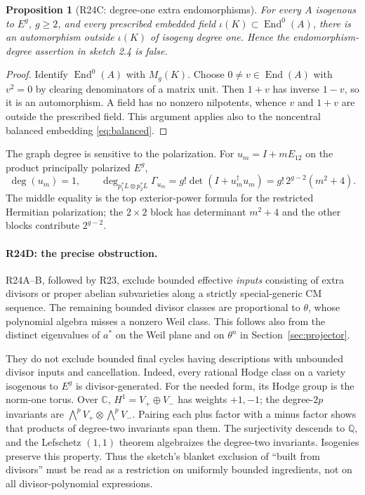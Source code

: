 \documentclass[11pt,a4paper]{article}
\newtheorem{proposition}[theorem]{Proposition}
\theoremstyle{definition}\newtheorem{definition}[theorem]{Definition}
\theoremstyle{remark}\newtheorem{remark}[theorem]{Remark}
\newcommand{\Q}{\mathbb Q}\newcommand{\Z}{\mathbb Z}\newcommand{\C}{\mathbb C}\newcommand{\R}{\mathbb R}
\newcommand{\End}{\operatorname{End}}\newcommand{\NS}{\operatorname{NS}}\newcommand{\Hom}{\operatorname{Hom}}
\begin{document}
\begin{proposition}[R24C: degree-one extra endomorphisms]\label{R24C}
For every $A$ isogenous to $E^g$, $g\ge2$, and every prescribed embedded field $\iota(K)\subset\End^0(A)$, there is an automorphism outside $\iota(K)$ of isogeny degree one. Hence the endomorphism-degree assertion in sketch 2.4 is false.
\end{proposition}
\begin{proof}
Identify $\End^0(A)$ with $M_g(K)$. Choose $0\ne v\in\End(A)$ with $v^2=0$ by clearing denominators of a matrix unit. Then $1+v$ has inverse $1-v$, so it is an automorphism. A field has no nonzero nilpotents, whence $v$ and $1+v$ are outside the prescribed field. This argument applies also to the noncentral balanced embedding \eqref{eq:balanced}.
\end{proof}

The graph degree is sensitive to the polarization. For $u_m=I+mE_{12}$ on the product principally polarized $E^g$,
\begin{equation}\label{eq:unipotentgraph}
 \deg(u_m)=1,\qquad
 \deg_{p_1^*L\otimes p_2^*L}\Gamma_{u_m}
 =g!\det(I+u_m^\dagger u_m)
 =g!\,2^{g-2}(m^2+4).
\end{equation}
The middle equality is the top exterior-power formula for the restricted Hermitian polarization; the $2\times2$ block has determinant $m^2+4$ and the other blocks contribute $2^{g-2}$.

\paragraph{R24D: the precise obstruction.}
R24A--B, followed by R23, exclude bounded effective \emph{inputs} consisting of extra divisors or proper abelian subvarieties along a strictly special-generic CM sequence. The remaining bounded divisor classes are proportional to $\theta$, whose polynomial algebra misses a nonzero Weil class. This follows also from the distinct eigenvalues of $a^*$ on the Weil plane and on $\theta^n$ in Section~\ref{sec:projector}.

They do not exclude bounded final cycles having descriptions with unbounded divisor inputs and cancellation. Indeed, every rational Hodge class on a variety isogenous to $E^g$ is divisor-generated. For the needed form, its Hodge group is the norm-one torus. Over $\C$, $H^1=V_+\oplus V_-$ has weights $+1,-1$; the degree-$2p$ invariants are $\bigwedge^pV_+\otimes\bigwedge^pV_-$. Pairing each plus factor with a minus factor shows that products of degree-two invariants span them. The surjectivity descends to $\Q$, and the Lefschetz $(1,1)$ theorem algebraizes the degree-two invariants. Isogenies preserve this property. Thus the sketch's blanket exclusion of ``built from divisors'' must be read as a restriction on uniformly bounded ingredients, not on all divisor-polynomial expressions.
\end{document}
